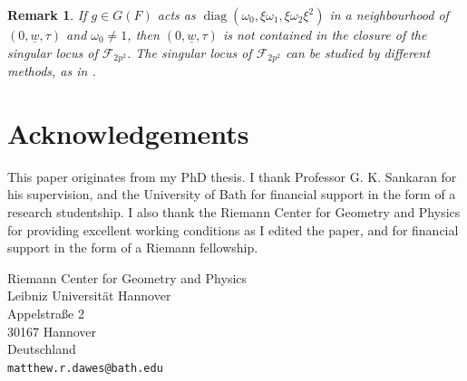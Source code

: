 \documentclass[11pt]{amsart}
\newtheorem{rmk}[thm]{Remark}
\newcommand{\opn}{\operatorname}
\newcommand{\fc}{\mathcal{F}}
\begin{document}
\begin{rmk}
If $g \in G(F)$ acts as $\opn{diag}(\omega_0, \xi \omega_1, \xi \omega_2 \xi^2)$ in a neighbourhood of $(0, \underline{w}, \tau)$ and $\omega_0 \neq 1$, then $(0, \underline{w}, \tau)$ is not contained in the closure of the singular locus of $\fc_{2p^2}$.
The singular locus of $\fc_{2p^2}$ can be studied by different methods, as in \cite{daweskod}.
\end{rmk}
\section{Acknowledgements}
This paper originates from my PhD thesis.
I thank Professor G. K. Sankaran for his supervision, and the University of Bath for financial support in the form of a research studentship.
I also thank the Riemann Center for Geometry and Physics for providing excellent working conditions as I edited the paper, and for financial support in the form of a Riemann fellowship. 

{}
\bigskip
{
Riemann Center for Geometry and Physics \\
Leibniz Universit\"at Hannover \\
Appelstra\ss e 2 \\
30167 Hannover  \\
Deutschland 
}
\bigskip
\\
\texttt{matthew.r.dawes@bath.edu}
\end{document}
